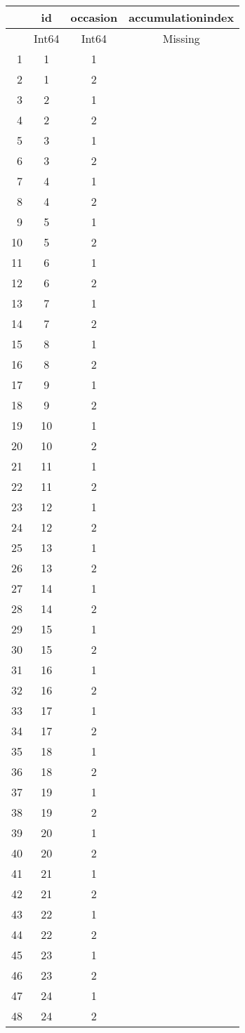 \documentclass[12pt,a4paper]{article}
\begin{document}
\begin{tabular}{r|ccc}
	& id & occasion & accumulationindex\\
	\hline
	& Int64 & Int64 & Missing\\
	\hline
	1 & 1 & 1 &  \\
	2 & 1 & 2 &  \\
	3 & 2 & 1 &  \\
	4 & 2 & 2 &  \\
	5 & 3 & 1 &  \\
	6 & 3 & 2 &  \\
	7 & 4 & 1 &  \\
	8 & 4 & 2 &  \\
	9 & 5 & 1 &  \\
	10 & 5 & 2 &  \\
	11 & 6 & 1 &  \\
	12 & 6 & 2 &  \\
	13 & 7 & 1 &  \\
	14 & 7 & 2 &  \\
	15 & 8 & 1 &  \\
	16 & 8 & 2 &  \\
	17 & 9 & 1 &  \\
	18 & 9 & 2 &  \\
	19 & 10 & 1 &  \\
	20 & 10 & 2 &  \\
	21 & 11 & 1 &  \\
	22 & 11 & 2 &  \\
	23 & 12 & 1 &  \\
	24 & 12 & 2 &  \\
	25 & 13 & 1 &  \\
	26 & 13 & 2 &  \\
	27 & 14 & 1 &  \\
	28 & 14 & 2 &  \\
	29 & 15 & 1 &  \\
	30 & 15 & 2 &  \\
	31 & 16 & 1 &  \\
	32 & 16 & 2 &  \\
	33 & 17 & 1 &  \\
	34 & 17 & 2 &  \\
	35 & 18 & 1 &  \\
	36 & 18 & 2 &  \\
	37 & 19 & 1 &  \\
	38 & 19 & 2 &  \\
	39 & 20 & 1 &  \\
	40 & 20 & 2 &  \\
	41 & 21 & 1 &  \\
	42 & 21 & 2 &  \\
	43 & 22 & 1 &  \\
	44 & 22 & 2 &  \\
	45 & 23 & 1 &  \\
	46 & 23 & 2 &  \\
	47 & 24 & 1 &  \\
	48 & 24 & 2 &  \\
\end{tabular}
\end{document}
